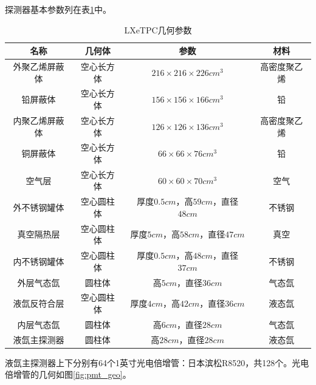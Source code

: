 探测器基本参数列在表\ref{tab:relics_material}中。

\begin{table}
  \centering
  \caption{LXeTPC几何参数}
  \begin{tabular}{cccc}
    \toprule
    名称 & 几何体 & 参数 & 材料 \\
    \midrule
    外聚乙烯屏蔽体 & 空心长方体 & $216\times216\times226\si{cm^3}$ & 高密度聚乙烯 \\
    铅屏蔽体 & 空心长方体 & $156\times156\times166\si{cm^3}$ & 铅 \\
    内聚乙烯屏蔽体 & 空心长方体 & $126\times126\times136\si{cm^3}$ & 高密度聚乙烯 \\
    铜屏蔽体 & 空心长方体 & $66\times66\times76\si{cm^3}$ & 铅 \\
    空气层 & 空心长方体 & $60\times60\times70\si{cm^3}$ & 空气 \\
    外不锈钢罐体 & 空心圆柱体 & 厚度$0.5\si{cm}$，高$59\si{cm}$，直径$48\si{cm}$ & 不锈钢 \\
    真空隔热层 & 空心圆柱体 & 厚度$5\si{cm}$，高$58\si{cm}$，直径$47\si{cm}$ & 真空 \\
    内不锈钢罐体 & 空心圆柱体 & 厚度$0.5\si{cm}$，高$48\si{cm}$，直径$37\si{cm}$ & 不锈钢 \\
    外层气态氙 & 圆柱体 & 高$5\si{cm}$，直径$36\si{cm}$ & 气态氙 \\
    液氙反符合层 & 空心圆柱体 & 厚度$4\si{cm}$，高$42\si{cm}$，直径$36\si{cm}$ & 液态氙 \\
    内层气态氙 & 圆柱体 & 高$6\si{cm}$，直径$28\si{cm}$ & 气态氙 \\
    液氙主探测器 & 圆柱体 & 高$28\si{cm}$，直径$28\si{cm}$ & 液态氙 \\
    \bottomrule
  \end{tabular}
  \label{tab:relics_material}
\end{table}

液氙主探测器上下分别有64个1英寸光电倍增管：日本滨松R8520，共128个。光电倍增管的几何如图\ref{fig:pmt_geo}。

